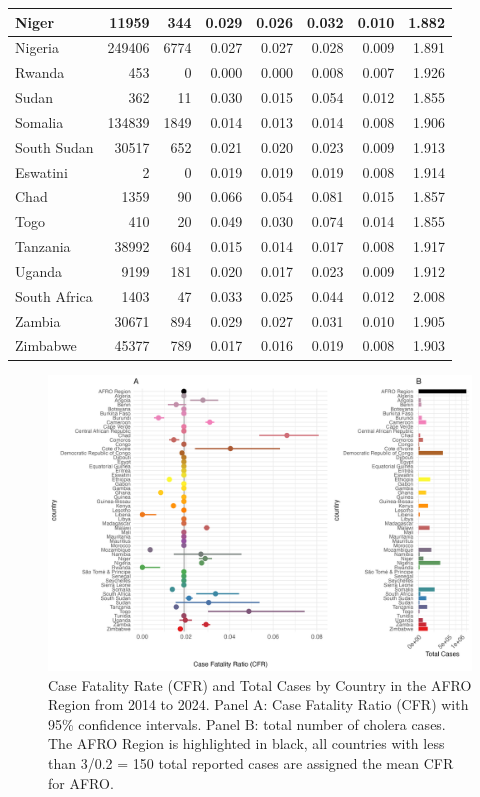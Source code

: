 \documentclass[
]{book}
\begin{document}
\begin{table}
\begin{tabular}[t]{l|r|r|r|r|r|r|r}
\hline
Niger & 11959 & 344 & 0.029 & 0.026 & 0.032 & 0.010 & 1.882\\
\hline
Nigeria & 249406 & 6774 & 0.027 & 0.027 & 0.028 & 0.009 & 1.891\\
\hline
Rwanda & 453 & 0 & 0.000 & 0.000 & 0.008 & 0.007 & 1.926\\
\hline
Sudan & 362 & 11 & 0.030 & 0.015 & 0.054 & 0.012 & 1.855\\
\hline
Somalia & 134839 & 1849 & 0.014 & 0.013 & 0.014 & 0.008 & 1.906\\
\hline
South Sudan & 30517 & 652 & 0.021 & 0.020 & 0.023 & 0.009 & 1.913\\
\hline
Eswatini & 2 & 0 & 0.019 & 0.019 & 0.019 & 0.008 & 1.914\\
\hline
Chad & 1359 & 90 & 0.066 & 0.054 & 0.081 & 0.015 & 1.857\\
\hline
Togo & 410 & 20 & 0.049 & 0.030 & 0.074 & 0.014 & 1.855\\
\hline
Tanzania & 38992 & 604 & 0.015 & 0.014 & 0.017 & 0.008 & 1.917\\
\hline
Uganda & 9199 & 181 & 0.020 & 0.017 & 0.023 & 0.009 & 1.912\\
\hline
South Africa & 1403 & 47 & 0.033 & 0.025 & 0.044 & 0.012 & 2.008\\
\hline
Zambia & 30671 & 894 & 0.029 & 0.027 & 0.031 & 0.010 & 1.905\\
\hline
Zimbabwe & 45377 & 789 & 0.017 & 0.016 & 0.019 & 0.008 & 1.903\\
\hline
\end{tabular}
\end{table}

\begin{figure}

{\centering \includegraphics[width=1\linewidth]{figures/case_fatality_ratio_and_cases_total_by_country} 

}

\caption{Case Fatality Rate (CFR) and Total Cases by Country in the AFRO Region from 2014 to 2024. Panel A: Case Fatality Ratio (CFR) with 95\% confidence intervals. Panel B: total number of cholera cases. The AFRO Region is highlighted in black, all countries with less than 3/0.2 = 150 total reported cases are assigned the mean CFR for AFRO.}\label{fig:cfr-cases}
\end{figure}
\end{document}
